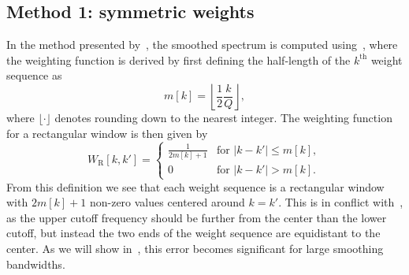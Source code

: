 \subsection{Method 1: symmetric weights} \label{sec:A3_Smoothing_Weights:Smoothing_Methods:Hatziantoniou_Method}
In the method presented by~\citet{HatziantoniouMourjopoulos2000}, the smoothed spectrum is computed using~, where the weighting function is derived by first defining the half-length of the $k^{\textrm{th}}$ weight sequence as
\begin{equation}\label{eq:A3_Smoothing_Weights:HatzHalfWidth}
m[k] = \left\lfloor \frac{1}{2}\frac{k}{Q} \right\rfloor,
\end{equation}
where $\lfloor \cdot \rfloor$ denotes rounding down to the nearest integer.
The weighting function for a rectangular window is then given by
\begin{equation}\label{eq:A3_Smoothing_Weights:HatzWeights}
W_{\textrm{R}}[k, k'] = \left\{
    \begin{array}{cl}
	\displaystyle \frac{1}{2 m[k] + 1} & \textrm{for } \left| k - k' \right| \leq m[k],\\[8pt]
	0 & \textrm{for } \left| k - k' \right| > m[k].
    \end{array}\right.
\end{equation}
From this definition we see that each weight sequence is a rectangular window with $2 m[k] + 1$ non-zero values centered around $k = k'$.
This is in conflict with~, as the upper cutoff frequency should be further from the center than the lower cutoff, but instead the two ends of the weight sequence are equidistant to the center.
As we will show in~, this error becomes significant for large smoothing bandwidths.

